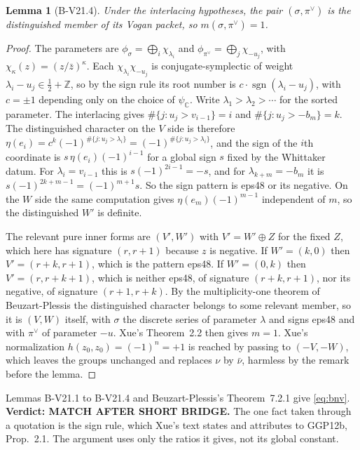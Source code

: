 \documentclass[11pt]{article}
\newtheorem{lemma}{Lemma}
\theoremstyle{definition}
\begin{document}
\begin{lemma}[B-V21.4]
Under the interlacing hypotheses, the pair $(\sigma,\pi^\vee)$ is the distinguished member of its Vogan packet, so $m(\sigma,\pi^\vee)=1$.
\end{lemma}
\begin{proof}
The parameters are $\phi_\sigma=\bigoplus_i\chi_{\lambda_i}$ and $\phi_{\pi^\vee}=\bigoplus_j\chi_{-u_j}$, with $\chi_\kappa(z)=(z/\bar z)^\kappa$. Each $\chi_{\lambda_i}\chi_{-u_j}$ is conjugate-symplectic of weight $\lambda_i-u_j\in\frac12+\mathbb Z$, so by the sign rule its root number is $c\cdot\operatorname{sgn}(\lambda_i-u_j)$, with $c=\pm1$ depending only on the choice of $\psi_{\mathbb C}$. Write $\lambda_1>\lambda_2>\cdots$ for the sorted parameter. The interlacing gives $\#\{j:u_j>v_{i-1}\}=i$ and $\#\{j:u_j>-b_m\}=k$. The distinguished character on the $V$ side is therefore $\eta(e_i)=c^k(-1)^{\#\{j:u_j>\lambda_i\}}=(-1)^{\#\{j:u_j>\lambda_i\}}$, and the sign of the $i$th coordinate is $s\,\eta(e_i)(-1)^{i-1}$ for a global sign $s$ fixed by the Whittaker datum. For $\lambda_i=v_{i-1}$ this is $s(-1)^{2i-1}=-s$, and for $\lambda_{k+m}=-b_m$ it is $s(-1)^{2k+m-1}=(-1)^{m+1}s$. So the sign pattern is eps48 or its negative. On the $W$ side the same computation gives $\eta(e_m)(-1)^{m-1}$ independent of $m$, so the distinguished $W'$ is definite.

The relevant pure inner forms are $(V',W')$ with $V'=W'\oplus Z$ for the fixed $Z$, which here has signature $(r,r+1)$ because $z$ is negative. If $W'=(k,0)$ then $V'=(r+k,r+1)$, which is the pattern eps48. If $W'=(0,k)$ then $V'=(r,r+k+1)$, which is neither eps48, of signature $(r+k,r+1)$, nor its negative, of signature $(r+1,r+k)$. By the multiplicity-one theorem of Beuzart-Plessis the distinguished character belongs to some relevant member, so it is $(V,W)$ itself, with $\sigma$ the discrete series of parameter $\lambda$ and signs eps48 and with $\pi^\vee$ of parameter $-u$. Xue's Theorem~2.2 then gives $m=1$. Xue's normalization $h(z_0,z_0)=(-1)^n=+1$ is reached by passing to $(-V,-W)$, which leaves the groups unchanged and replaces $\nu$ by $\bar\nu$, harmless by the remark before the lemma.
\end{proof}

Lemmas B-V21.1 to B-V21.4 and Beuzart-Plessis's Theorem~7.2.1 give \eqref{eq:bnv}. \textbf{Verdict: MATCH AFTER SHORT BRIDGE.} The one fact taken through a quotation is the sign rule, which Xue's text states and attributes to GGP12b, Prop.~2.1. The argument uses only the ratios it gives, not its global constant.
\end{document}
